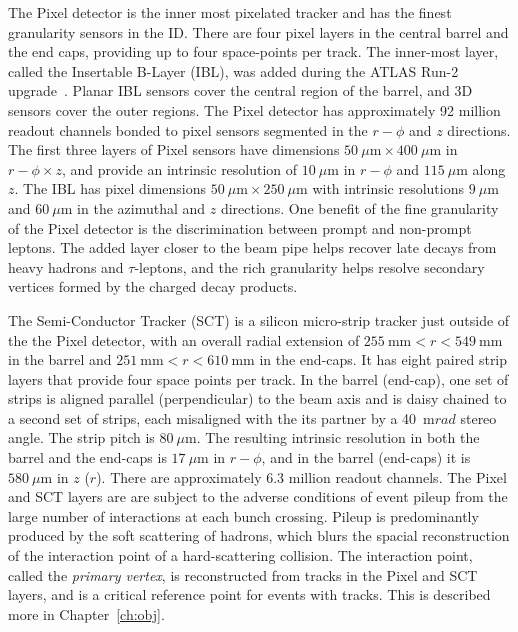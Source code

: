 The Pixel detector is the inner most pixelated tracker and has the finest granularity sensors in the ID.  There are four pixel layers in the central barrel and the end caps, providing up to four space-points per track.  The inner-most layer, called the Insertable B-Layer (IBL), was added during the ATLAS Run-2 upgrade~\cite{Takubo:2014qsa}.  Planar IBL sensors cover the central region of the barrel, and 3D sensors cover the outer regions.  The Pixel detector has approximately 92 million readout channels bonded to pixel sensors segmented in the $r-\phi$ and $z$ directions.  The first three layers of Pixel sensors have dimensions $50~\mu \mathrm{m} \times 400~\mu \mathrm{m}$ in $r-\phi \times z$, and provide an intrinsic resolution of $10~\mu \mathrm{m}$ in $r-\phi$ and $115~\mu \mathrm{m}$ along $z$.  The IBL has pixel dimensions $50~\mu \mathrm{m} \times 250~\mu \mathrm{m}$ with intrinsic resolutions $9~\mu \mathrm{m}$ and $60~\mu \mathrm{m}$ in the azimuthal and $z$ directions.  One benefit of the fine granularity of the Pixel detector is the discrimination between prompt and non-prompt leptons.  The added layer closer to the beam pipe helps recover late decays from heavy hadrons and $\tau$-leptons, and the rich granularity helps resolve secondary vertices formed by the charged decay products. 

The Semi-Conductor Tracker (SCT) is a silicon micro-strip tracker just outside of the the Pixel detector, with an overall radial extension of $255~\mathrm{mm} < r < 549~\mathrm{mm}$ in the barrel and $251~\mathrm{mm} < r < 610~\mathrm{mm}$ in the end-caps.  It has eight paired strip layers that provide four space points per track.  In the barrel (end-cap), one set of strips is aligned parallel (perpendicular) to the beam axis and is daisy chained to a second set of strips, each misaligned with the its partner by a 40~$\mathrm{m}rad$ stereo angle\cite{Abdesselam:2006wt}.  The strip pitch is $80~\mu \mathrm{m}$.  The resulting intrinsic resolution in both the barrel and the end-caps is $17~\mu \mathrm{m}$ in  $r-\phi$, and in the barrel (end-caps) it is $580~\mu \mathrm{m}$ in $z$ ($r$).  There are approximately 6.3 million readout channels.  The Pixel and SCT layers are are subject to the adverse conditions of event pileup from the large number of interactions at each bunch crossing.  Pileup is predominantly produced by the soft scattering of hadrons, which blurs the spacial reconstruction of the interaction point of a hard-scattering collision.  The interaction point, called the \textit{primary vertex}, is reconstructed from tracks in the Pixel and SCT layers, and is a critical reference point for events with tracks.  This is described more in Chapter~\ref{ch:obj}.

